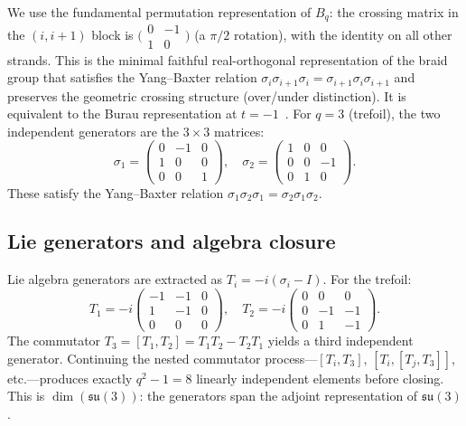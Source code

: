 \documentclass[11pt]{article}
\newcommand{\su}{\mathfrak{su}}
\begin{document}
We use the fundamental permutation representation of $B_q$: the
crossing matrix in the $(i, i{+}1)$ block is
$\bigl(\begin{smallmatrix} 0 & -1 \\ 1 & 0 \end{smallmatrix}\bigr)$
(a $\pi/2$ rotation), with the identity on all other strands.
This is the minimal faithful real-orthogonal representation of
the braid group that satisfies the Yang--Baxter relation
$\sigma_i\sigma_{i+1}\sigma_i = \sigma_{i+1}\sigma_i\sigma_{i+1}$
and preserves the geometric crossing structure (over/under
distinction).  It is equivalent to the Burau representation at
$t = -1$~\cite{Birman1974}.
For $q = 3$ (trefoil), the two independent generators are the
$3 \times 3$ matrices:
\begin{equation}
\label{eq:braid-gens}
  \sigma_1 = \begin{pmatrix}
    0 & -1 & 0 \\ 1 & 0 & 0 \\ 0 & 0 & 1
  \end{pmatrix}\!,\quad
  \sigma_2 = \begin{pmatrix}
    1 & 0 & 0 \\ 0 & 0 & -1 \\ 0 & 1 & 0
  \end{pmatrix}\!.
\end{equation}
These satisfy the Yang--Baxter relation
$\sigma_1\sigma_2\sigma_1 = \sigma_2\sigma_1\sigma_2$.

\subsection{Lie generators and algebra closure}

Lie algebra generators are extracted as $T_i = -i(\sigma_i - I)$.
For the trefoil:
\begin{equation}
\label{eq:lie-gens}
  T_1 = -i\begin{pmatrix}
    -1 & -1 & 0 \\ 1 & -1 & 0 \\ 0 & 0 & 0
  \end{pmatrix}\!,\quad
  T_2 = -i\begin{pmatrix}
    0 & 0 & 0 \\ 0 & -1 & -1 \\ 0 & 1 & -1
  \end{pmatrix}\!.
\end{equation}
The commutator $T_3 = [T_1, T_2] = T_1 T_2 - T_2 T_1$ yields a
third independent generator.  Continuing the nested commutator
process---$[T_i, T_3]$, $[T_i, [T_j, T_3]]$,
etc.---produces exactly $q^2 - 1 = 8$ linearly independent
elements before closing.  This is $\dim(\su(3))$: the generators
span the adjoint representation of $\su(3)$.
\end{document}
